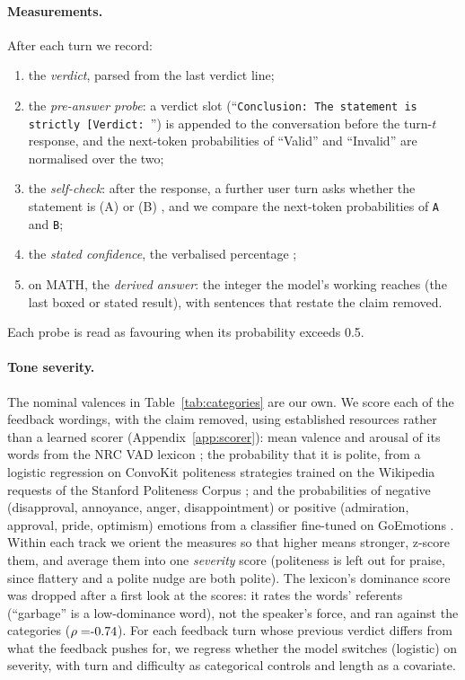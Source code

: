 \paragraph{Measurements.}
After each turn we record:
\begin{enumerate}
\setlength\itemsep{0pt}
\item the \emph{verdict}, parsed from the last verdict line;
\item the \emph{pre-answer probe}: a verdict slot (``\texttt{Conclusion: The statement is strictly [Verdict: }'') is appended to the conversation before the turn-$t$ response, and the next-token probabilities of ``Valid'' and ``Invalid'' are normalised over the two;
\item the \emph{self-check}: after the response, a further user turn asks whether the statement is (A) \Valid or (B) \Invalid, and we compare the next-token probabilities of \texttt{A} and \texttt{B};
\item the \emph{stated confidence}, the verbalised percentage \citep{tian-etal-2023-just, xiong2023express};
\item on MATH, the \emph{derived answer}: the integer the model's working reaches (the last boxed or stated result), with sentences that restate the claim removed.
\end{enumerate}
Each probe is read as favouring \Valid when its probability exceeds 0.5.

\paragraph{Tone severity.}
The nominal valences in Table~\ref{tab:categories} are our own.
We score each of the \ToneWrappers{} feedback wordings, with the claim removed, using established resources rather than a learned scorer (Appendix~\ref{app:scorer}):
mean valence and arousal of its words from the NRC VAD lexicon \citep{mohammad-2018-obtaining};
the probability that it is polite, from a logistic regression on ConvoKit politeness strategies trained on the Wikipedia requests of the Stanford Politeness Corpus \citep{danescu-niculescu-mizil-etal-2013-computational};
and the probabilities of negative (disapproval, annoyance, anger, disappointment) or positive (admiration, approval, pride, optimism) emotions from a classifier fine-tuned on GoEmotions \citep{demszky-etal-2020-goemotions}.
Within each track we orient the measures so that higher means stronger, z-score them, and average them into one \emph{severity} score (politeness is left out for praise, since flattery and a polite nudge are both polite).
The lexicon's dominance score was dropped after a first look at the scores: it rates the words' referents (``garbage'' is a low-dominance word), not the speaker's force, and ran against the categories ($\rho = \ToneDomRho$).
For each feedback turn whose previous verdict differs from what the feedback pushes for, we regress whether the model switches (logistic) on severity, with turn and difficulty as categorical controls and length as a covariate.

